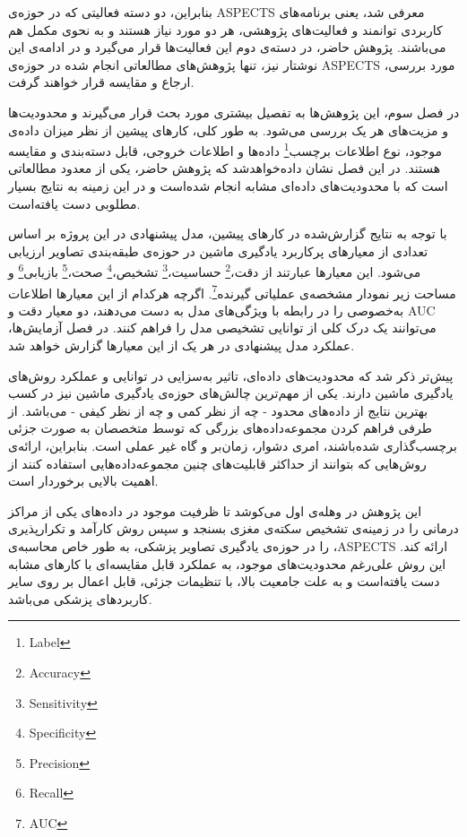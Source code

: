 بنابراین، دو دسته فعالیتی که در حوزه‌ی ASPECTS معرفی شد، یعنی برنامه‌های کاربردی توانمند و فعالیت‌های پژوهشی، هر دو مورد نیاز هستند و به نحوی مکمل هم می‌باشند.
پژوهش حاضر، در دسته‌ی دوم این فعالیت‌ها قرار می‌گیرد
و در ادامه‌ی این نوشتار نیز، تنها پژوهش‌های مطالعاتی انجام شده در حوزه‌ی ASPECTS مورد بررسی، ارجاع و مقایسه قرار خواهند گرفت.

در فصل سوم، این پژوهش‌ها به تفصیل بیشتری مورد 
بحث قرار می‌‌گیرند و
محدودیت‌ها و مزیت‌های هر یک بررسی می‌شود.
به طور کلی، کار‌های پیشین از نظر میزان داده‌ی موجود، نوع اطلاعات 
برچسب\footnote{Label}
داده‌ها و اطلاعات خروجی،
قابل دسته‌بندی و مقایسه هستند.
در این فصل نشان داده‌خواهدشد که پژوهش حاضر، یکی از معدود مطالعاتی است که با محدودیت‌های داده‌ای مشابه انجام شده‌است و 
در این زمینه به نتایج بسیار مطلوبی دست یافته‌است.

با توجه به نتایج گزارش‌شده در کارهای پیشین،
مدل پیشنهادی در این پروژه بر اساس تعدادی از معیار‌های پرکاربرد یادگیری ماشین  
در حوزه‌ی طبقه‌بندی تصاویر 
ارزیابی می‌شود.
این معیارها عبارتند از
 دقت،\footnote{Accuracy}
حساسیت،\footnote{Sensitivity}
تشخیص،\footnote{Specificity}
صحت،\footnote{Precision}
بازیابی\footnote{Recall}
و 
مساحت زیر نمودار مشخصه‌ی عملیاتی گیرنده\footnote{AUC}.
اگرچه هرکدام از این معیار‌ها اطلاعات به‌خصوصی را در رابطه با ویژگی‌های مدل به دست می‌دهند، دو معیار دقت و AUC می‌توانند یک درک کلی از توانایی تشخیصی مدل را فراهم کنند.
در فصل آزمایش‌ها، عملکرد مدل پیشنهادی در هر یک از این معیار‌ها گزارش خواهد شد.


پیش‌تر ذکر شد که محدودیت‌های داده‌ای، تاثیر به‌سزایی در توانایی و عملکرد روش‌های یادگیری ماشین دارند.
یکی از مهم‌ترین چالش‌های حوزه‌ی یادگیری ماشین نیز در کسب بهترین نتایج از داده‌های محدود - چه از نظر کمی و چه از نظر کیفی - می‌باشد.
از طرفی فراهم کردن مجموعه‌داده‌های بزرگی که توسط متخصصان به صورت جزئی برچسب‌گذاری شده‌باشند، امری دشوار، زمان‌بر و گاه غیر عملی است.
بنابراین، ارائه‌ی روش‌هایی که بتوانند از حداکثر قابلیت‌های چنین مجموعه‌داده‌هایی استفاده کنند از اهمیت بالایی برخوردار است.

این پژوهش در وهله‌ی اول می‌کوشد تا ظرفیت موجود در داده‌های یکی از مراکز درمانی را در زمینه‌ی تشخیص سکته‌ی مغزی بسنجد و سپس روش کارآمد و تکرارپذیری را در حوزه‌ی یادگیری تصاویر پزشکی، به طور خاص محاسبه‌ی ،ASPECTS ارائه کند.
این روش علی‌رغم محدودیت‌های موجود، به عملکرد قابل مقایسه‌ای با کارهای مشابه دست یافته‌است و
به علت جامعیت بالا، با تنظیمات جزئی، قابل اعمال بر روی سایر کاربرد‌های پزشکی می‌باشد.




